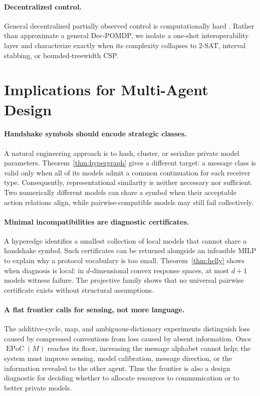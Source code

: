 \documentclass[letterpaper]{article} %
\newcommand{\EPoC}{\operatorname{EPoC}}
\begin{document}
\paragraph{Decentralized control.}
General decentralized partially observed control is computationally hard
\citep{bernstein2002complexity}. Rather than approximate a general Dec-POMDP,
we isolate a one-shot interoperability layer and characterize exactly when its
complexity collapses to 2-SAT, interval stabbing, or bounded-treewidth CSP.

\section{Implications for Multi-Agent Design}

\paragraph{Handshake symbols should encode strategic classes.}
A natural engineering approach is to hash, cluster, or serialize private model
parameters. Theorem~\ref{thm:hypergraph} gives a different target: a message
class is valid only when all of its models admit a common continuation for each
receiver type. Consequently, representational similarity is neither necessary
nor sufficient. Two numerically different models can share a symbol when their
acceptable action relations align, while pairwise-compatible models may still
fail collectively.

\paragraph{Minimal incompatibilities are diagnostic certificates.}
A hyperedge identifies a smallest collection of local models that cannot share
a handshake symbol. Such certificates can be returned alongside an infeasible
MILP to explain why a protocol vocabulary is too small. Theorem~\ref{thm:helly}
shows when diagnosis is local: in $d$-dimensional convex response spaces, at
most $d+1$ models witness failure. The projective family shows that no universal
pairwise certificate exists without structural assumptions.

\paragraph{A flat frontier calls for sensing, not more language.}
The additive-cycle, map, and ambiguous-dictionary experiments distinguish loss caused by
compressed conventions from loss caused by absent information. Once
$\EPoC(M)$ reaches its floor, increasing the message alphabet cannot help; the
system must improve sensing, model calibration, message direction, or the
information revealed to the other agent. Thus the frontier is also a design
diagnostic for deciding whether to allocate resources to communication or to
better private models.
\end{document}
